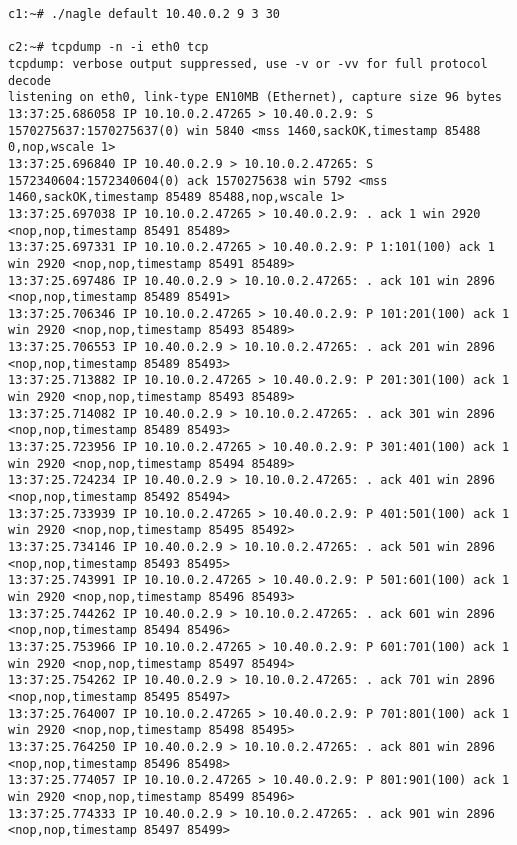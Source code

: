 \documentclass[a4paper,12pt]{article}
\begin{document}
\begin{lstlisting}
c1:~# ./nagle default 10.40.0.2 9 3 30

c2:~# tcpdump -n -i eth0 tcp
tcpdump: verbose output suppressed, use -v or -vv for full protocol decode
listening on eth0, link-type EN10MB (Ethernet), capture size 96 bytes
13:37:25.686058 IP 10.10.0.2.47265 > 10.40.0.2.9: S 1570275637:1570275637(0) win 5840 <mss 1460,sackOK,timestamp 85488 0,nop,wscale 1>
13:37:25.696840 IP 10.40.0.2.9 > 10.10.0.2.47265: S 1572340604:1572340604(0) ack 1570275638 win 5792 <mss 1460,sackOK,timestamp 85489 85488,nop,wscale 1>
13:37:25.697038 IP 10.10.0.2.47265 > 10.40.0.2.9: . ack 1 win 2920 <nop,nop,timestamp 85491 85489>
13:37:25.697331 IP 10.10.0.2.47265 > 10.40.0.2.9: P 1:101(100) ack 1 win 2920 <nop,nop,timestamp 85491 85489>
13:37:25.697486 IP 10.40.0.2.9 > 10.10.0.2.47265: . ack 101 win 2896 <nop,nop,timestamp 85489 85491>
13:37:25.706346 IP 10.10.0.2.47265 > 10.40.0.2.9: P 101:201(100) ack 1 win 2920 <nop,nop,timestamp 85493 85489>
13:37:25.706553 IP 10.40.0.2.9 > 10.10.0.2.47265: . ack 201 win 2896 <nop,nop,timestamp 85489 85493>
13:37:25.713882 IP 10.10.0.2.47265 > 10.40.0.2.9: P 201:301(100) ack 1 win 2920 <nop,nop,timestamp 85493 85489>
13:37:25.714082 IP 10.40.0.2.9 > 10.10.0.2.47265: . ack 301 win 2896 <nop,nop,timestamp 85489 85493>
13:37:25.723956 IP 10.10.0.2.47265 > 10.40.0.2.9: P 301:401(100) ack 1 win 2920 <nop,nop,timestamp 85494 85489>
13:37:25.724234 IP 10.40.0.2.9 > 10.10.0.2.47265: . ack 401 win 2896 <nop,nop,timestamp 85492 85494>
13:37:25.733939 IP 10.10.0.2.47265 > 10.40.0.2.9: P 401:501(100) ack 1 win 2920 <nop,nop,timestamp 85495 85492>
13:37:25.734146 IP 10.40.0.2.9 > 10.10.0.2.47265: . ack 501 win 2896 <nop,nop,timestamp 85493 85495>
13:37:25.743991 IP 10.10.0.2.47265 > 10.40.0.2.9: P 501:601(100) ack 1 win 2920 <nop,nop,timestamp 85496 85493>
13:37:25.744262 IP 10.40.0.2.9 > 10.10.0.2.47265: . ack 601 win 2896 <nop,nop,timestamp 85494 85496>
13:37:25.753966 IP 10.10.0.2.47265 > 10.40.0.2.9: P 601:701(100) ack 1 win 2920 <nop,nop,timestamp 85497 85494>
13:37:25.754262 IP 10.40.0.2.9 > 10.10.0.2.47265: . ack 701 win 2896 <nop,nop,timestamp 85495 85497>
13:37:25.764007 IP 10.10.0.2.47265 > 10.40.0.2.9: P 701:801(100) ack 1 win 2920 <nop,nop,timestamp 85498 85495>
13:37:25.764250 IP 10.40.0.2.9 > 10.10.0.2.47265: . ack 801 win 2896 <nop,nop,timestamp 85496 85498>
13:37:25.774057 IP 10.10.0.2.47265 > 10.40.0.2.9: P 801:901(100) ack 1 win 2920 <nop,nop,timestamp 85499 85496>
13:37:25.774333 IP 10.40.0.2.9 > 10.10.0.2.47265: . ack 901 win 2896 <nop,nop,timestamp 85497 85499>

\end{lstlisting}
\end{document}
